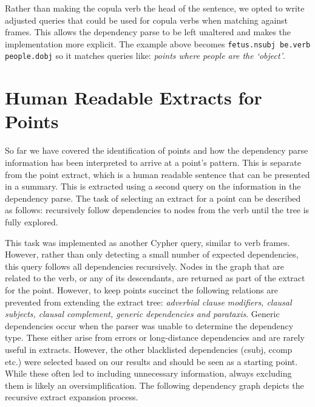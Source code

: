       Rather than making the copula verb the head of the sentence, we opted to write adjusted queries that could be used for copula verbs when matching against frames. This allows the dependency parse to be left unaltered and makes the implementation more explicit. The example above becomes \texttt{fetus.nsubj be.verb people.dobj} so it matches queries like: \textit{points where people are the `object'}.

  \section{Human Readable Extracts for Points}
    So far we have covered the identification of points and how the dependency parse information has been interpreted to arrive at a point's pattern. This is separate from the point extract, which is a human readable sentence that can be presented in a summary. This is extracted using a second query on the information in the dependency parse. The task of selecting an extract for a point can be described as follows: recursively follow dependencies to nodes from the verb until the tree is fully explored.

    This task was implemented as another Cypher query, similar to verb frames. However, rather than only detecting a small number of expected dependencies, this query follows all dependencies recursively. Nodes in the graph that are related to the verb, or any of its descendants, are returned as part of the extract for the point. However, to keep points succinct the following relations are prevented from extending the extract tree: \textit{adverbial clause modifiers, clausal subjects, clausal complement, generic dependencies and parataxis}. Generic dependencies occur when the parser was unable to determine the dependency type. These either arise from errors or long-distance dependencies and are rarely useful in extracts. However, the other blacklisted dependencies (csubj, ccomp etc.) were selected based on our results and should be seen as a starting point. While these often led to including unnecessary information, always excluding them is likely an oversimplification. The following dependency graph depicts the recursive extract expansion process.

